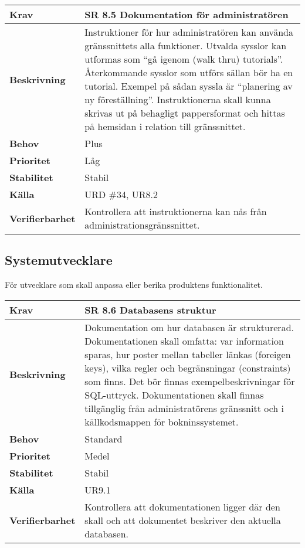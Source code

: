 \documentclass[a4paper, twoside, 11pt, titlepage]{article}
\begin{document}
	\begin{tabular} { p{2.6cm} p{12.5cm} }
		\hline
		\sffamily\textbf{Krav} & \sffamily\textbf{SR 8.5 Dokumentation för administratören } \\
		\hline
		\sffamily\textbf{Beskrivning} & Instruktioner för hur administratören kan använda gränssnittets alla funktioner. Utvalda sysslor kan utformas som ``gå igenom (walk thru) tutorials''. Återkommande sysslor som utförs sällan bör ha en tutorial. Exempel på sådan syssla är ``planering av ny föreställning''. Instruktionerna skall kunna skrivas ut på behagligt pappersformat och hittas på hemsidan i relation till gränssnittet.  \\
		\hline
		\sffamily\textbf{Behov} & Plus  \\
		\hline
		\sffamily\textbf{Prioritet} & Låg  \\
		\hline
		\sffamily\textbf{Stabilitet} & Stabil  \\
		\hline
		\sffamily\textbf{Källa} & URD \#34, UR8.2  \\
		\hline
		\sffamily\textbf{Verifierbarhet} & Kontrollera att instruktionerna kan nås från administrationsgränssnittet.  \\
		\hline
	\end{tabular}


	\subsection{Systemutvecklare}


	För utvecklare som skall anpassa eller berika produktens funktionalitet.

	\begin{tabular} { p{2.6cm} p{12.5cm} }
		\hline
		\sffamily\textbf{Krav} & \sffamily\textbf{SR 8.6 Databasens struktur } \\
		\hline
		\sffamily\textbf{Beskrivning} & Dokumentation om hur databasen är strukturerad. Dokumentationen skall omfatta: var information sparas, hur poster mellan tabeller länkas (foreigen keys), vilka regler och begränsningar (constraints) som finns. Det bör finnas exempelbeskrivningar för SQL-uttryck. Dokumentationen skall finnas tillgänglig från administratörens gränssnitt och i källkodsmappen för bokninssystemet.  \\
		\hline
		\sffamily\textbf{Behov} & Standard  \\
		\hline
		\sffamily\textbf{Prioritet} & Medel  \\
		\hline
		\sffamily\textbf{Stabilitet} & Stabil  \\
		\hline
		\sffamily\textbf{Källa} & UR9.1  \\
		\hline
		\sffamily\textbf{Verifierbarhet} & Kontrollera att dokumentationen ligger där den skall och att dokumentet beskriver den aktuella databasen.  \\
		\hline
	\end{tabular}
	\vspace{6mm}
\end{document}
